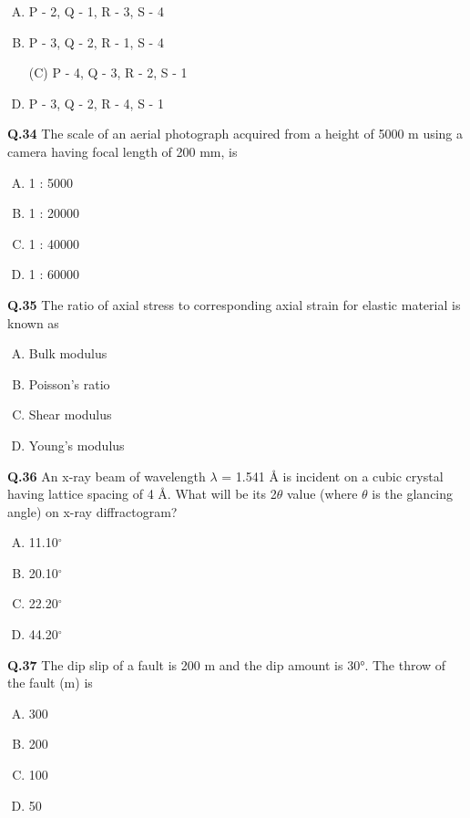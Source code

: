 \begin{enumerate}[(A)]
\item P - 2, Q - 1, R - 3, S - 4 \item  P - 3, Q - 2, R - 1, S - 4
\item[(C)] P - 4, Q - 3, R - 2, S - 1 \item  P - 3, Q - 2, R - 4, S - 1
\end{enumerate}

\textbf{Q.34} The scale of an aerial photograph acquired from a height of 5000 m using a camera having focal length of 200 mm, is
\begin{enumerate}[(A)]
\item 1 : 5000 \item  1 : 20000 \item  1 : 40000 \item  1 : 60000
\end{enumerate}

\textbf{Q.35} The ratio of axial stress to corresponding axial strain for elastic material is known as
\begin{enumerate}[(A)]
\item Bulk modulus \item  Poisson's ratio \item  Shear modulus \item  Young's modulus
\end{enumerate}

\textbf{Q.36} An x-ray beam of wavelength $\lambda$ = 1.541 Å is incident on a cubic crystal having lattice spacing of 4 Å. What will be its 2$\theta$ value (where $\theta$ is the glancing angle) on x-ray diffractogram?
\begin{multicols}{4}
    

\begin{enumerate}[(A)]
\item 11.10$^{\circ}$ \item  20.10$^{\circ}$ \item  22.20$^{\circ}$ \item  44.20$^{\circ}$
\end{enumerate}
\end{multicols}







\textbf{Q.37} The dip slip of a fault is 200 m and the dip amount is 30°. The throw of the fault (m) is
\begin{multicols}{4}
    

\begin{enumerate}[(A)]
    \item 300
    \item 200
    \item 100
    \item 50
\end{enumerate}
\end{multicols}

